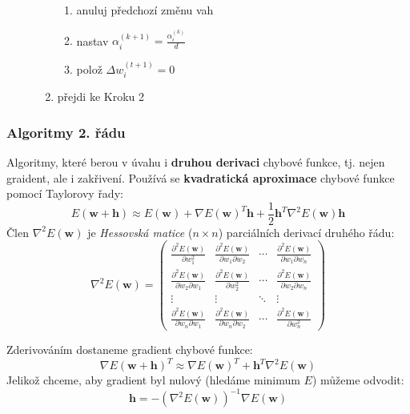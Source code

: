 \documentclass[11pt]{report} %
\renewcommand{\vec}[1]{\mathbf{#1}}
\numberwithin{equation}{section}
\begin{document}
\begin{description}
\begin{enumerate}
\begin{enumerate}
			
			\item anuluj předchozí změnu vah
			\item nastav $\alpha_i^{(k+1)} = \frac{\alpha_i^{(k)}}{d}$
			\item polož $\Delta w_i^{(t+1)} = 0$
		\end{enumerate}
		\item přejdi ke Kroku 2
	\end{enumerate}
\end{description}

\subsubsection{Algoritmy 2. řádu}
Algoritmy, které berou v úvahu i \textbf{druhou derivaci} chybové funkce, tj. nejen graident, ale i zakřivení. Používá se \textbf{kvadratická aproximace} chybové funkce pomocí Taylorovy řady:
$$E(\vec{w} + \vec{h}) \approx E(\vec{w}) + \nabla E(\vec{w})^{T} \vec{h} + \frac{1}{2} \vec{h}^T \nabla^2 E(\vec{w}) \vec{h}$$
Člen $\nabla^2 E(\vec{w})$  je \textit{Hessovská matice} ($n\times n$) parciálních derivací druhého řádu:
$$
\nabla^2 E(\vec{w}) = 
\begin{pmatrix}
\frac{\partial^2 E(\vec{w})}{\partial w_1^2} & \frac{\partial^2 E(\vec{w})}{\partial w_1 \partial w_2} & \cdots & \frac{\partial^2 E(\vec{w})}{\partial w_1 \partial w_n} \\[10pt]
\frac{\partial^2 E(\vec{w})}{\partial w_2 \partial w_1} & \frac{\partial^2 E(\vec{w})}{\partial w_2^2} & \cdots & \frac{\partial^2 E(\vec{w})}{\partial w_2 \partial w_n} \\
\vdots  & \vdots  & \ddots & \vdots  \\
\frac{\partial^2 E(\vec{w})}{\partial w_n \partial w_1} & \frac{\partial^2 E(\vec{w})}{\partial w_n \partial w_2} & \cdots & \frac{\partial^2 E(\vec{w})}{\partial w_n^2} 
\end{pmatrix}
$$

Zderivováním dostaneme gradient chybové funkce:
$$
\nabla E(\vec{w} + \vec{h})^T \approx \nabla E(\vec{w})^T + \vec{h}^T \nabla^2 E(\vec{w})
$$
Jelikož chceme, aby gradient byl nulový (hledáme minimum $E$) můžeme odvodit:
$$
\vec{h} = - (\nabla^2 E(\vec{w}))^{-1} \nabla E(\vec{w})
$$
\end{document}
